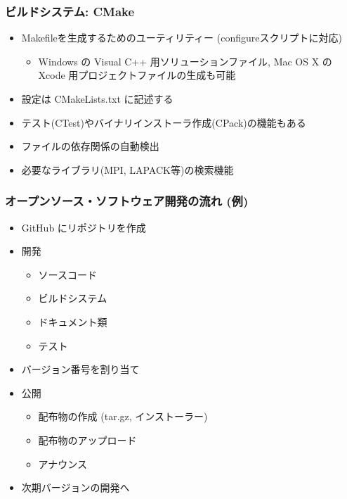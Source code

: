 \begin{frame}
  \frametitle{ビルドシステム: CMake}
  \begin{itemize}
    \setlength{\itemsep}{1em}
  \item Makefileを生成するためのユーティリティー (configureスクリプトに対応)
    \begin{itemize}
    \item Windows の Visual C++ 用ソリューションファイル, Mac OS X の Xcode 用プロジェクトファイルの生成も可能
    \end{itemize}
  \item 設定は CMakeLists.txt に記述する
  \item テスト(CTest)やバイナリインストーラ作成(CPack)の機能もある
  \item ファイルの依存関係の自動検出
  \item 必要なライブラリ(MPI, LAPACK等)の検索機能
  \end{itemize}
\end{frame}

\begin{frame}
  \frametitle{オープンソース・ソフトウェア開発の流れ (例)}
  \begin{itemize}
  \item GitHub にリポジトリを作成
  \item 開発
    \begin{itemize}
    \item ソースコード
    \item ビルドシステム
    \item ドキュメント類
    \item テスト
    \end{itemize}
  \item バージョン番号を割り当て
  \item 公開
    \begin{itemize}
    \item 配布物の作成 (tar.gz, インストーラー)
    \item 配布物のアップロード
    \item アナウンス
    \end{itemize}
  \item 次期バージョンの開発へ
  \end{itemize}
\end{frame}

